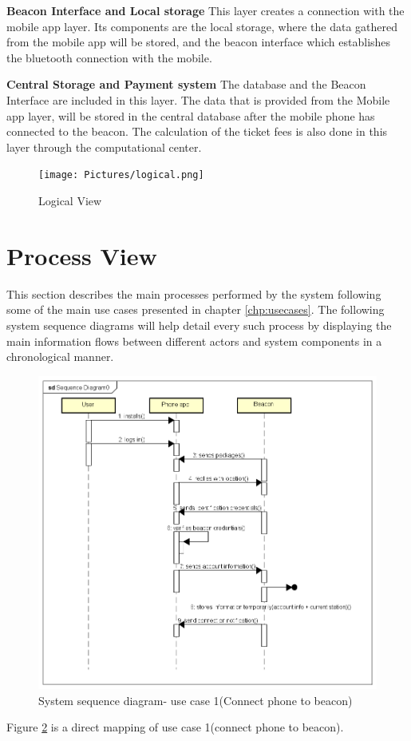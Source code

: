 \textbf{Beacon Interface and Local storage} This layer creates a connection with the mobile app layer. Its components are the local storage, where the data gathered from the mobile app will be stored, and the beacon interface which establishes the bluetooth connection with the mobile.

\textbf{Central Storage and Payment system} The database and the Beacon Interface are included in this layer. The data that is provided from the Mobile app layer, will be stored in the central database after the mobile phone has connected to the beacon. The calculation of the ticket fees is also done in this layer through the computational center.

\begin{figure}[H]
  \centering
  \texttt{[image: Pictures/logical.png]}
  \caption{Logical View}
  \label{fig:logical}
\end{figure}

\section{Process View}
This section describes the main processes performed by the system following some of the main use cases presented in chapter \ref{chp:usecases}. The following system sequence diagrams will help detail every such process by displaying the main information flows between different actors and system components in a chronological manner.

\begin{figure}[H]
	\centering
	\includegraphics[width=\textwidth]{Pictures/seq_diagram_uc1.png}
	\caption{System sequence diagram- use case 1(Connect phone to beacon)}
	\label{fig:seqDiagram1}
\end{figure}
Figure \ref{fig:seqDiagram1} is a direct mapping of use case 1(connect phone to beacon).

